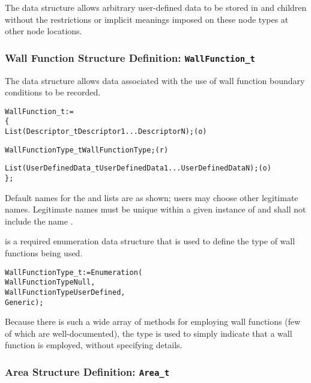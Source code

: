 The  data structure allows arbitrary
user-defined data to be stored in  and
 children without the restrictions or implicit
meanings imposed on these node types at other node locations.

\subsubsection{Wall Function Structure Definition: \texttt{WallFunction\_t}}
\label{s:WallFunction}

The  data structure allows data associated with
the use of wall function boundary conditions to be recorded.

\begin{alltt}
  WallFunction\_t :=
    \{
    List( Descriptor\_t  Descriptor1 ... DescriptorN ) ;                     (o)

    WallFunctionType\_t WallFunctionType ;                                   (r)

    List( UserDefinedData\_t UserDefinedData1 ... UserDefinedDataN ) ;       (o)
    \} ;
\end{alltt}

\begin{notes}
\item
 Default names for the  and 
 lists are as shown; users may choose other legitimate names.
 Legitimate names must be unique within a given instance of
  and shall not include the name
 .
\end{notes}

 is a required enumeration data structure
that is used to define the type of wall functions being used.
\begin{alltt}
  WallFunctionType\_t := Enumeration(
    WallFunctionTypeNull,
    WallFunctionTypeUserDefined,
    Generic ) ;
\end{alltt}
Because there is such a wide array of methods for employing wall
functions (few of which are well-documented), the type 
is used to simply indicate that a wall function is employed, without
specifying details.

\subsubsection{Area Structure Definition: \texttt{Area\_t}}
\label{s:Area}

